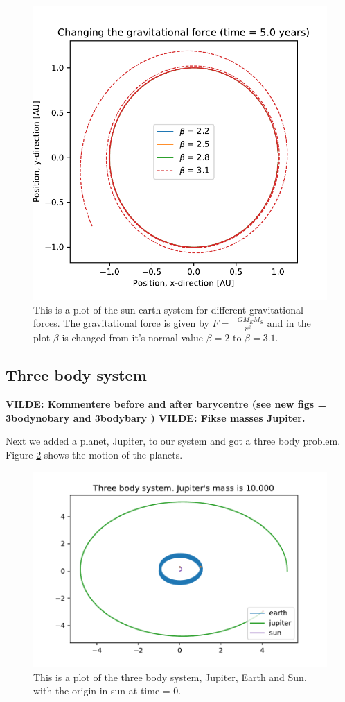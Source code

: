 \begin{figure}[H]
\includegraphics[width=0.9\linewidth]{../results/plots/diffenrent_gravitation.pdf}\caption{This is a plot of the sun-earth system for different gravitational forces. The gravitational force is given by $ F = \frac{-GM_EM_S}{r^\beta}$ and in the plot $\beta$ is changed from it's normal value $\beta = 2$ to $\beta = 3.1$.}\label{fig:different_gravitation}
\end{figure}

\subsection{Three body system}

\textbf{VILDE: Kommentere before and after barycentre (see new figs = 3bodynobary and 3bodybary )
VILDE: Fikse masses Jupiter. }



Next we added a planet, Jupiter, to our system and got a three body problem. Figure \ref{fig:three_body_sun_origin} shows the motion of the planets.


\begin{figure}[H]
	\includegraphics[width=0.9\linewidth]{../results/plots/Jupitermass_is_1_0000_earth.pdf}
	\caption{This is a plot of the three body system, Jupiter, Earth and Sun, with the origin in sun at time = 0.}\label{fig:three_body_sun_origin}
\end{figure}


